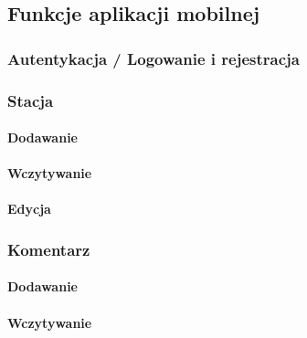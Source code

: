 \subsection{Funkcje aplikacji mobilnej}
\subsubsection{Autentykacja / Logowanie i rejestracja}
\subsubsection{Stacja}
\paragraph{Dodawanie}
\paragraph{Wczytywanie}
\paragraph{Edycja}
\subsubsection{Komentarz}
\paragraph{Dodawanie}
\paragraph{Wczytywanie}

